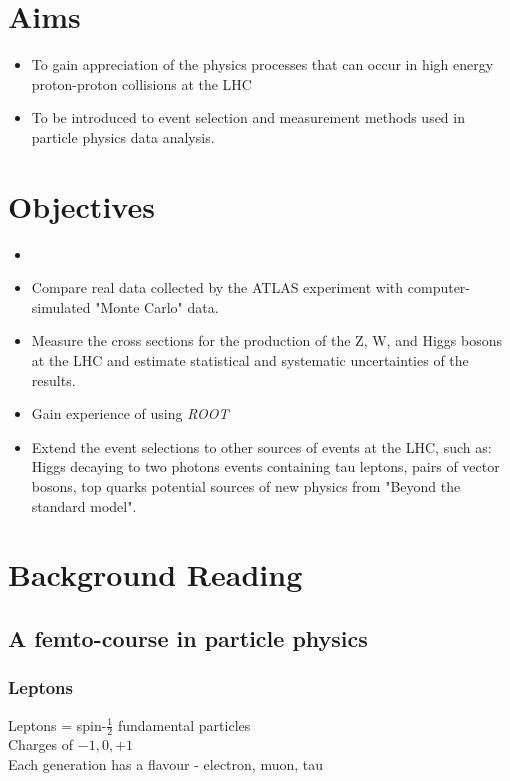 \section{Aims}
\begin{itemize}
    \item To gain appreciation of the physics processes that can occur in high energy proton-proton collisions at the LHC
    \item To be introduced to event selection and measurement methods used in particle physics data analysis.
\end{itemize}

\section{Objectives}
\begin{itemize}
    \item
    \item Compare real data collected by the ATLAS experiment with computer-simulated "Monte Carlo" data.
    \item Measure the cross sections for the production of the Z, W, and Higgs bosons at the LHC and estimate
    statistical and systematic uncertainties of the results.
    \item Gain experience of using \it{ROOT}
    \item Extend the event selections to other sources of events at the LHC, such as:
    \subitem Higgs decaying to two photons
    \subitem events containing tau leptons, pairs of vector bosons, top quarks
    \subitem potential sources of new physics from "Beyond the standard model".
\end{itemize}

\section{Background Reading}

\subsection{A femto-course in particle physics}

\subsubsection{Leptons}
Leptons = spin-$\frac{1}{2}$ fundamental particles\\
Charges of $-1, 0, +1$\\
Each generation has a flavour -  electron, muon, tau

